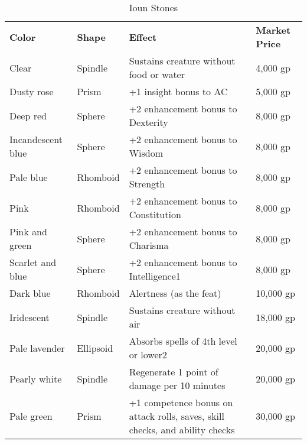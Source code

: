 \begin{table}[]
\sffamily
\caption{Ioun Stones}
\begin{tabular}{llll}
\textbf{Color}     & \textbf{Shape} & \textbf{Effect}                                                              & \textbf{Market Price} \\
Clear              & Spindle        & Sustains creature without food or water                                      & 4,000 gp              \\
Dusty rose         & Prism          & +1 insight bonus to AC                                                       & 5,000 gp              \\
Deep red           & Sphere         & +2 enhancement bonus to Dexterity                                            & 8,000 gp              \\
Incandescent blue  & Sphere         & +2 enhancement bonus to Wisdom                                               & 8,000 gp              \\
Pale blue          & Rhomboid       & +2 enhancement bonus to Strength                                             & 8,000 gp              \\
Pink               & Rhomboid       & +2 enhancement bonus to Constitution                                         & 8,000 gp              \\
Pink and green     & Sphere         & +2 enhancement bonus to Charisma                                             & 8,000 gp              \\
Scarlet and blue   & Sphere         & +2 enhancement bonus to Intelligence1                                        & 8,000 gp              \\
Dark blue          & Rhomboid       & Alertness (as the feat)                                                      & 10,000 gp             \\
Iridescent         & Spindle        & Sustains creature without air                                                & 18,000 gp             \\
Pale lavender      & Ellipsoid      & Absorbs spells of 4th level or lower2                                        & 20,000 gp             \\
Pearly white       & Spindle        & Regenerate 1 point of damage per 10 minutes                                  & 20,000 gp             \\
Pale green         & Prism          & +1 competence bonus on attack rolls, saves, skill checks, and ability checks & 30,000 gp             \\

\end{tabular}
\end{table}
